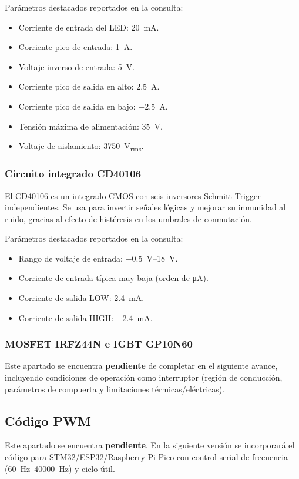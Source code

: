 \documentclass[12pt]{article}
\begin{document}
Parámetros destacados reportados en la consulta:
\begin{itemize}
    \item Corriente de entrada del LED: \SI{20}{mA}.
    \item Corriente pico de entrada: \SI{1}{A}.
    \item Voltaje inverso de entrada: \SI{5}{V}.
    \item Corriente pico de salida en alto: \SI{2.5}{A}.
    \item Corriente pico de salida en bajo: \SI{-2.5}{A}.
    \item Tensión máxima de alimentación: \SI{35}{V}.
    \item Voltaje de aislamiento: \SI{3750}{V_{rms}}.
\end{itemize}

\subsubsection{Circuito integrado CD40106}
El CD40106 es un integrado CMOS con seis inversores Schmitt Trigger independientes. Se usa para invertir señales lógicas y mejorar su inmunidad al ruido, gracias al efecto de histéresis en los umbrales de conmutación.

Parámetros destacados reportados en la consulta:
\begin{itemize}
    \item Rango de voltaje de entrada: \SIrange{-0.5}{18}{V}.
    \item Corriente de entrada típica muy baja (orden de \si{\micro\ampere}).
    \item Corriente de salida LOW: \SI{2.4}{mA}.
    \item Corriente de salida HIGH: \SI{-2.4}{mA}.
\end{itemize}

\subsubsection{MOSFET IRFZ44N e IGBT GP10N60}
Este apartado se encuentra \textbf{pendiente} de completar en el siguiente avance, incluyendo condiciones de operación como interruptor (región de conducción, parámetros de compuerta y limitaciones térmicas/eléctricas).

\subsection{Código PWM}
Este apartado se encuentra \textbf{pendiente}. En la siguiente versión se incorporará el código para STM32/ESP32/Raspberry Pi Pico con control serial de frecuencia (\SIrange{60}{40000}{Hz}) y ciclo útil.
\end{document}
